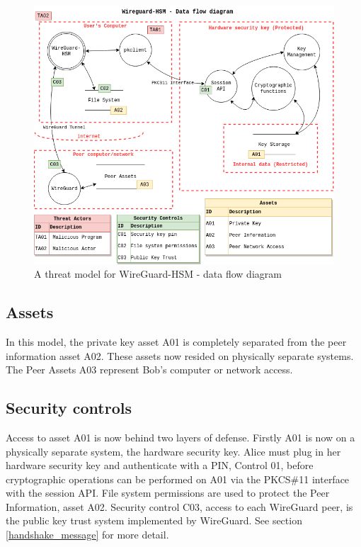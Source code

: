 \documentclass [11pt, proquest] {uwthesis}[2020/02/24]
\begin{document}
\begin{figure}[ht]
\includegraphics[width=14cm]{paper/images/WGHSM__NoPin_DFD.drawio}
\caption{A threat model for WireGuard-HSM - data flow diagram}
\label{fig:wg_hsm_dfd}
\end{figure}

\subsection{Assets}
In this model, the private key asset A01 is completely separated from the peer information asset A02. These assets now resided on physically separate systems. The Peer Assets A03 represent Bob's computer or network access.

\subsection{Security controls}
Access to asset A01 is now behind two layers of defense. Firstly A01 is now on a physically separate system, the hardware security key. Alice must plug in her hardware security key and authenticate with a PIN, Control 01, before cryptographic operations can be performed on A01 via the PKCS\#11 interface with the session API.
File system permissions are used to protect the Peer Information, asset A02.
Security control C03, access to each WireGuard peer, is the public key trust system implemented by WireGuard. See section \ref{handshake_message} for more detail.
\end{document}
